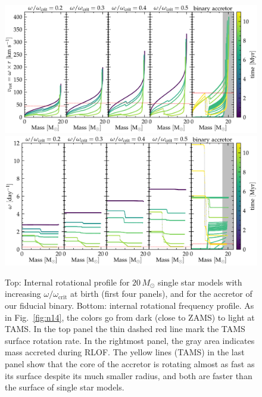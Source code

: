 \documentclass[twocolumn,twocolappendix,trackchanges]{aastex63}
\DeclareRobustCommand{\Figref}[1]{Fig.~\ref{#1}}
\begin{document}
\begin{figure}[tbp]
  \centering
  \includegraphics[width=\textwidth]{zeta_Rotational_struct}
  \includegraphics[width=\textwidth]{omega_struct}
  \caption{Top: Internal rotational profile for $20\,M_\odot$ single
    star models with increasing $\omega/\omega_\mathrm{crit}$ at birth
    (first four panels), and for the accretor of our fiducial
    binary. Bottom: internal rotational frequency profile. As in
    \Figref{fig:n14}, the colors go from dark (close to ZAMS) to light
    at TAMS. In the top panel the thin dashed red line mark the TAMS
    surface rotation rate. In the rightmost panel, the gray area
    indicates mass accreted during RLOF. The yellow lines (TAMS) in
    the last panel show that the core of the accretor is rotating
    almost as fast as its surface despite its much smaller radius, and
    both are faster than the surface of single star models.}
  \label{fig:struct_rot}
\end{figure}
\end{document}
